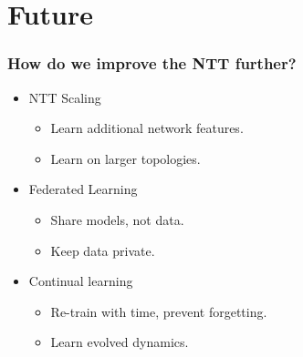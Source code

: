 \documentclass{beamer}
\begin{document}

\section{Future}

\begin{frame}
\frametitle{How do we improve the NTT further?}
\pause
\begin{itemize}
    \item<1-> NTT Scaling
    \begin{itemize}
    	\item<1-> Learn additional network features.
	\item<1-> Learn on larger topologies.
    \end{itemize}
    \vspace{0.2cm}
    \pause
    \item<2-> Federated Learning
    \begin{itemize}
    	\item<2-> Share models, not data.
	\item<2->Keep data private.
	\end{itemize}
    \vspace{0.2cm}
    \pause
    
    \item<3-> Continual learning
    \begin{itemize}
    	\item<3->  Re-train with time, prevent forgetting.
	\item<3->  Learn evolved dynamics.
	\end{itemize}
\end{itemize}
\end{frame}
\end{document}
